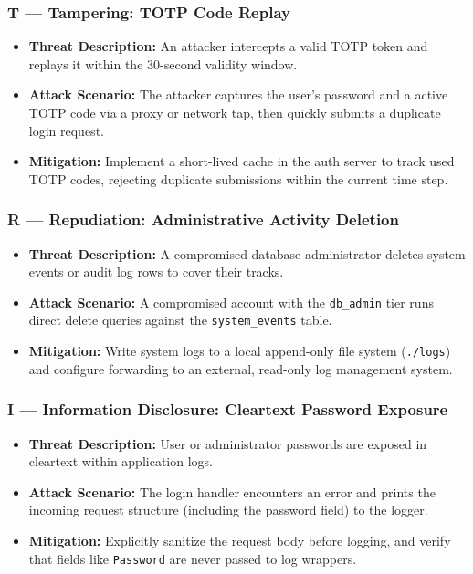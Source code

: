 \subsubsection{T --- Tampering: TOTP Code Replay}
\begin{itemize}[leftmargin=*]
    \item \textbf{Threat Description:} An attacker intercepts a valid TOTP token and replays it within the 30-second validity window.
    \item \textbf{Attack Scenario:} The attacker captures the user's password and a active TOTP code via a proxy or network tap, then quickly submits a duplicate login request.
    \item \textbf{Mitigation:} Implement a short-lived cache in the auth server to track used TOTP codes, rejecting duplicate submissions within the current time step.
\end{itemize}

\subsubsection{R --- Repudiation: Administrative Activity Deletion}
\begin{itemize}[leftmargin=*]
    \item \textbf{Threat Description:} A compromised database administrator deletes system events or audit log rows to cover their tracks.
    \item \textbf{Attack Scenario:} A compromised account with the \texttt{db\_admin} tier runs direct delete queries against the \texttt{system\_events} table.
    \item \textbf{Mitigation:} Write system logs to a local append-only file system (\texttt{./logs}) and configure forwarding to an external, read-only log management system.
\end{itemize}

\subsubsection{I --- Information Disclosure: Cleartext Password Exposure}
\begin{itemize}[leftmargin=*]
    \item \textbf{Threat Description:} User or administrator passwords are exposed in cleartext within application logs.
    \item \textbf{Attack Scenario:} The login handler encounters an error and prints the incoming request structure (including the password field) to the logger.
    \item \textbf{Mitigation:} Explicitly sanitize the request body before logging, and verify that fields like \texttt{Password} are never passed to log wrappers.
\end{itemize}

